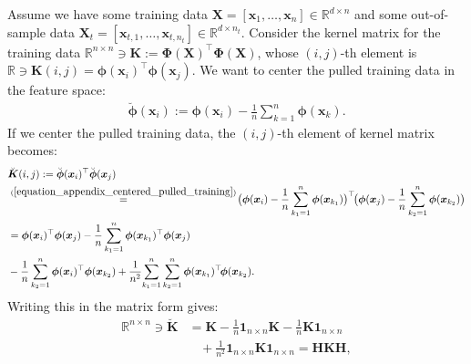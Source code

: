 \documentclass[lang=cn,10pt]{gorgeousnbook}
\numberwithin{equation}{section}%
\numberwithin{figure}{section}%
\begin{document}
Assume we have some training data $\boldsymbol{X} = [\boldsymbol{x}_1, \dots, \boldsymbol{x}_n] \in \mathbb{R}^{d \times n}$ and some out-of-sample data $\boldsymbol{X}_t = [\boldsymbol{x}_{t,1}, \dots, \boldsymbol{x}_{t,n_t}] \in \mathbb{R}^{d \times n_t}$. 
Consider the kernel matrix for the training data $\mathbb{R}^{n \times n} \ni \boldsymbol{K} := \boldsymbol{\Phi}(\boldsymbol{X})^\top \boldsymbol{\Phi}(\boldsymbol{X})$, whose $(i,j)$-th element is $\mathbb{R} \ni \boldsymbol{K}(i,j) = \boldsymbol{\phi}(\boldsymbol{x}_i)^\top \boldsymbol{\phi}(\boldsymbol{x}_j)$. 
We want to center the pulled training data in the feature space:
\begin{align}\label{equation_appendix_centered_pulled_training}
\breve{\boldsymbol{\phi}}(\boldsymbol{x}_i) := \boldsymbol{\phi}(\boldsymbol{x}_i) - \frac{1}{n} \sum_{k=1}^n \boldsymbol{\phi}(\boldsymbol{x}_k).
\end{align}
If we center the pulled training data, the $(i,j)$-th element of kernel matrix becomes:
\begin{align}
&\breve{\boldsymbol{K}}(i,j) := \breve{\boldsymbol{\phi}}(\boldsymbol{x}_i)^\top \breve{\boldsymbol{\phi}}(\boldsymbol{x}_j) \label{equation_centered_kernel_definition} \\
&\overset{(\ref{equation_appendix_centered_pulled_training})}{=}\! \big(\boldsymbol{\phi}(\boldsymbol{x}_i) - \frac{1}{n} \sum_{k_1=1}^n \boldsymbol{\phi}(\boldsymbol{x}_{k_1})\big)^\top \! \big(\boldsymbol{\phi}(\boldsymbol{x}_j) - \frac{1}{n} \sum_{k_2=1}^n \boldsymbol{\phi}(\boldsymbol{x}_{k_2})\big) \nonumber \\
&= \boldsymbol{\phi}(\boldsymbol{x}_i)^\top \boldsymbol{\phi}(\boldsymbol{x}_j) - \frac{1}{n} \sum_{k_1=1}^n \boldsymbol{\phi}(\boldsymbol{x}_{k_1})^\top \boldsymbol{\phi}(\boldsymbol{x}_j) \nonumber \\
&- \frac{1}{n} \sum_{k_2=1}^n \boldsymbol{\phi}(\boldsymbol{x}_i)^\top \boldsymbol{\phi}(\boldsymbol{x}_{k_2}) + \frac{1}{n^2}\! \sum_{k_1=1}^n  \sum_{k_2=1}^n \boldsymbol{\phi}(\boldsymbol{x}_{k_1})^\top \! \boldsymbol{\phi}(\boldsymbol{x}_{k_2}). \nonumber
\end{align}
Writing this in the matrix form gives:
\begin{align}
\mathbb{R}^{n \times n} \ni \breve{\boldsymbol{K}} &= \boldsymbol{K} - \frac{1}{n} \boldsymbol{1}_{n \times n} \boldsymbol{K} - \frac{1}{n} \boldsymbol{K} \boldsymbol{1}_{n \times n} \nonumber \\
&~~~~ + \frac{1}{n^2} \boldsymbol{1}_{n \times n} \boldsymbol{K} \boldsymbol{1}_{n \times n} = \boldsymbol{H} \boldsymbol{K} \boldsymbol{H}, \label{equation_appendix_doubleCentered_training_kernel}
\end{align}
\end{document}
